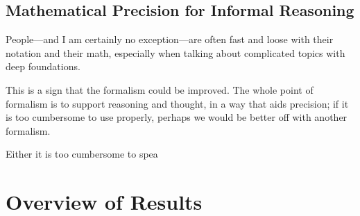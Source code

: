 \subsection{Mathematical Precision for Informal Reasoning}
People---and I am certainly no exception---are often fast and loose with their notation and their math, especially when talking about complicated topics with deep foundations. 

    
This is a sign that the formalism could be improved.
The whole point of formalism is to support reasoning and thought, 
    in a way that aids precision; if it is too cumbersome to use properly,
    perhaps we would be better off with another formalism.
    
    Either it is too cumbersome to spea


\section{Overview of Results}
